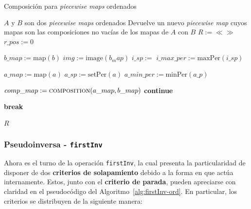 \begin{algorithm}
\caption{Composición para \textit{piecewise maps} ordenados}
\label{alg:composition-ord}
\begin{algorithmic}[1]
\Require $A$ y $B$ son dos \textit{piecewise maps} ordenados
\Ensure Devuelve un nuevo \textit{piecewise map} cuyos mapas son las composiciones no vacías de los mapas de $A$ con $B$
    \State $R := \ll\gg$   
    \State $r\_pos := 0$

        \State $b\_map := \mathrm{map}(b)$
        \State $img := \mathrm{image}(b_map)$
        \State $i\_sp :=$ 
        \State $i\_max\_per := \mathrm{maxPer}(i\_sp)$

        \State {}

            \State $a\_map := \mathrm{map}(a)$
            \State $a\_sp := \mathrm{setPer}(a)$
            \State $a\_min\_per := \mathrm{minPer}(a\_p)$



                \State $comp\_map := \Call{composition}{a\_map,b\_map}$
                    \State {}
                \EndIf
                \State \textbf{continue}
            \EndIf

                \State \textbf{break}
            \EndIf
        \EndFor
    \EndFor

    \State \Return $R$
\EndFunction
\end{algorithmic}
\end{algorithm}





\subsubsection{Pseudoinversa - \texttt{firstInv}}

Ahora es el turno de la operación \texttt{firstInv}, la cual presenta la particularidad 
de disponer de dos \textbf{criterios de solapamiento} debido a la forma en que actúa internamente.  
Estos, junto con el \textbf{criterio de parada}, pueden apreciarse con claridad en el pseudocódigo del Algoritmo~\ref{alg:firstInv-ord}.  
En particular, los criterios se distribuyen de la siguiente manera:


